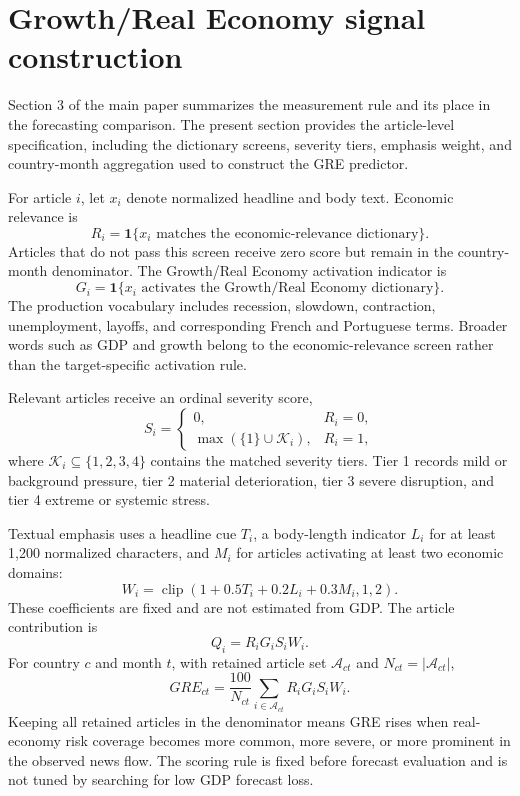 \documentclass[12pt]{article}
\begin{document}
\section{Growth/Real Economy signal construction}
Section 3 of the main paper summarizes the measurement rule and its place in the forecasting comparison. The present section provides the article-level specification, including the dictionary screens, severity tiers, emphasis weight, and country-month aggregation used to construct the GRE predictor.

For article $i$, let $x_i$ denote normalized headline and body text. Economic relevance is
\begin{equation}
R_i=\mathbf{1}\{x_i \text{ matches the economic-relevance dictionary}\}.
\end{equation}
Articles that do not pass this screen receive zero score but remain in the country-month denominator. The Growth/Real Economy activation indicator is
\begin{equation}
G_i=\mathbf{1}\{x_i \text{ activates the Growth/Real Economy dictionary}\}.
\end{equation}
The production vocabulary includes recession, slowdown, contraction, unemployment, layoffs, and corresponding French and Portuguese terms. Broader words such as GDP and growth belong to the economic-relevance screen rather than the target-specific activation rule.

Relevant articles receive an ordinal severity score,
\begin{equation}
S_i=\begin{cases}
0,&R_i=0,\\
\max(\{1\}\cup\mathcal K_i),&R_i=1,
\end{cases}
\end{equation}
where $\mathcal K_i\subseteq\{1,2,3,4\}$ contains the matched severity tiers. Tier 1 records mild or background pressure, tier 2 material deterioration, tier 3 severe disruption, and tier 4 extreme or systemic stress.

Textual emphasis uses a headline cue $T_i$, a body-length indicator $L_i$ for at least 1,200 normalized characters, and $M_i$ for articles activating at least two economic domains:
\begin{equation}
W_i=\operatorname{clip}(1+0.5T_i+0.2L_i+0.3M_i,1,2).
\end{equation}
These coefficients are fixed and are not estimated from GDP. The article contribution is
\begin{equation}
Q_i=R_iG_iS_iW_i.
\end{equation}
For country $c$ and month $t$, with retained article set $\mathcal A_{ct}$ and $N_{ct}=|\mathcal A_{ct}|$,
\begin{equation}
GRE_{ct}=\frac{100}{N_{ct}}\sum_{i\in\mathcal A_{ct}}R_iG_iS_iW_i.
\end{equation}
Keeping all retained articles in the denominator means GRE rises when real-economy risk coverage becomes more common, more severe, or more prominent in the observed news flow. The scoring rule is fixed before forecast evaluation and is not tuned by searching for low GDP forecast loss.
\end{document}
